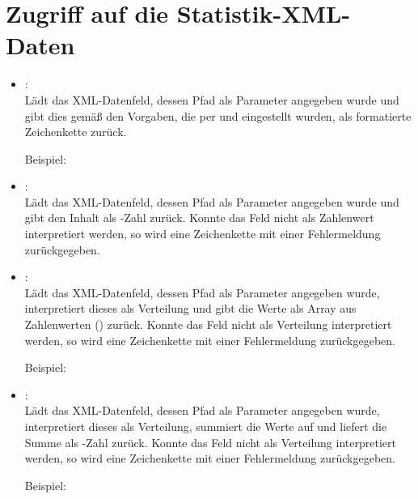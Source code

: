 \section{Zugriff auf die Statistik-XML-Daten}

\begin{itemize}

\item
{}:\\
Lädt das XML-Datenfeld, dessen Pfad als Parameter angegeben wurde und gibt dies gemäß den Vorgaben,
die per  und  eingestellt wurden,
als formatierte Zeichenkette zurück.

Beispiel: 

\item
{}:\\
Lädt das XML-Datenfeld, dessen Pfad als Parameter angegeben wurde und gibt den Inhalt als -Zahl zurück.
Konnte das Feld nicht als Zahlenwert interpretiert werden, so wird eine Zeichenkette mit einer Fehlermeldung
zurückgegeben.  

\item
{}:\\
Lädt das XML-Datenfeld, dessen Pfad als Parameter angegeben wurde, interpretiert dieses als Verteilung
und gibt die Werte als Array aus Zahlenwerten () zurück.
Konnte das Feld nicht als Verteilung interpretiert werden, so wird eine Zeichenkette mit einer Fehlermeldung
zurückgegeben.

Beispiel:\\

\item
{}:\\
Lädt das XML-Datenfeld, dessen Pfad als Parameter angegeben wurde, interpretiert dieses als Verteilung,
summiert die Werte auf und liefert die Summe als -Zahl zurück.
Konnte das Feld nicht als Verteilung interpretiert werden, so wird eine Zeichenkette mit einer Fehlermeldung
zurückgegeben.

Beispiel:\\


\end{itemize}

